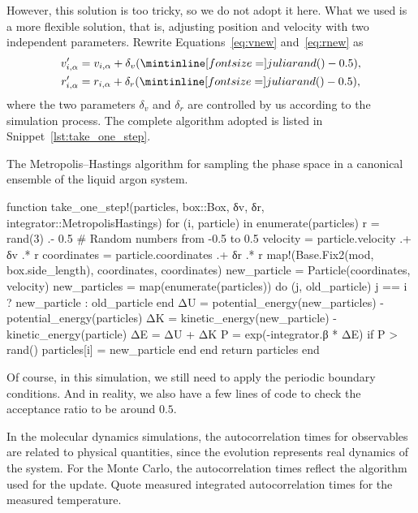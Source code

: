 However, this solution is too tricky, so we do not adopt it here.
What we used is a more flexible solution, that is, adjusting position and velocity
with two independent parameters. Rewrite Equations~\eqref{eq:vnew} and~\eqref{eq:rnew} as
%
\begin{align}
    v_{i, \alpha}' & = v_{i, \alpha} + \delta_v (\code{rand()} - 0.5), \\
    r_{i, \alpha}' & = r_{i, \alpha} + \delta_r (\code{rand()} - 0.5),
\end{align}
%
where the two parameters \(\delta_v\) and \(\delta_r\) are controlled by us according to
the simulation process. The complete algorithm adopted is listed in
Snippet~\ref{lst:take_one_step}.
%
\begin{algorithm}
    \caption{The Metropolis--Hastings algorithm for sampling the phase space in a canonical
        ensemble of the liquid argon system.}
    \label{lst:take_one_step}
    \begin{juliacode}
        function take_one_step!(particles, box::Box, δv, δr, integrator::MetropolisHastings)
            for (i, particle) in enumerate(particles)
                r = rand(3) .- 0.5  # Random numbers from -0.5 to 0.5
                velocity = particle.velocity .+ δv .* r
                coordinates = particle.coordinates .+ δr .* r
                map!(Base.Fix2(mod, box.side_length), coordinates, coordinates)
                new_particle = Particle(coordinates, velocity)
                new_particles = map(enumerate(particles)) do (j, old_particle)
                    j == i ? new_particle : old_particle
                end
                ΔU = potential_energy(new_particles) - potential_energy(particles)
                ΔK = kinetic_energy(new_particle) - kinetic_energy(particle)
                ΔE = ΔU + ΔK
                P = exp(-integrator.β * ΔE)
                if P > rand()
                    particles[i] = new_particle
                end
            end
            return particles
        end
    \end{juliacode}
\end{algorithm}
%
Of course, in this simulation, we still need to apply the periodic boundary conditions.
And in reality, we also have a few lines of code to check the acceptance ratio to be
around \(0.5\).


\Question{}
In the molecular dynamics simulations, the autocorrelation times for observables are related
to physical quantities, since the evolution represents real dynamics of the system. For the
Monte Carlo, the autocorrelation times reflect the algorithm used for the update. Quote
measured integrated autocorrelation times for the measured temperature.

\Answer{}
